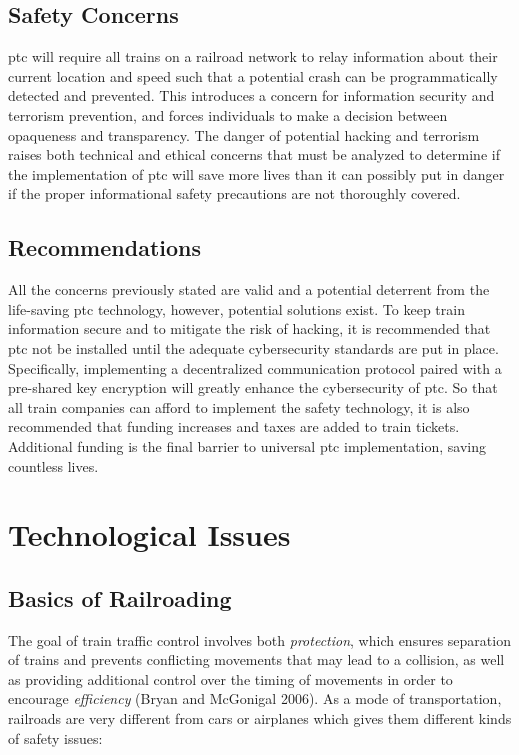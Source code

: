 \documentclass[11pt, titlepage]{article}
\begin{document}
\subsection{Safety Concerns}

\gls{ptc} will require all trains on a railroad network to relay information about
their current location and speed such that a potential crash can be
programmatically detected and prevented. This introduces a concern for information
security and terrorism prevention, and forces individuals to make a decision
between opaqueness and transparency. The danger of potential hacking and terrorism
raises both technical and ethical concerns that must be analyzed to determine if
the implementation of \gls{ptc} will save more lives than it can possibly put in
danger if the proper informational safety precautions are not thoroughly covered.

\subsection{Recommendations}

All the concerns previously stated are valid and a potential deterrent from the
life-saving \gls{ptc} technology, however, potential solutions exist. To keep
train information secure and to mitigate the risk of hacking, it is recommended
that \gls{ptc} not be installed until the adequate cybersecurity standards are put
in place. Specifically, implementing a decentralized communication protocol paired
with a pre-shared key encryption will greatly enhance the cybersecurity of
\gls{ptc}. So that all train companies can afford to implement the safety
technology, it is also recommended that funding increases and taxes are added to
train tickets. Additional funding is the final barrier to universal \gls{ptc}
implementation, saving countless lives.

\pagebreak

\section{Technological Issues}

\subsection{Basics of Railroading}

The goal of train traffic control involves both \textit{protection}, which ensures
separation of trains and prevents conflicting movements that may lead to a
collision, as well as providing additional control over the timing of movements in
order to encourage \textit{efficiency} (Bryan and McGonigal 2006). As a mode of
transportation, railroads are very different from cars or airplanes which gives
them different kinds of safety issues:
\end{document}
